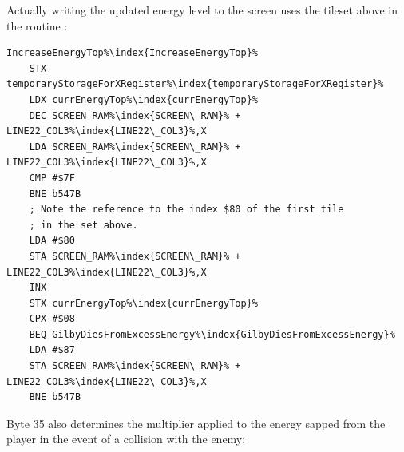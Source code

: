 Actually writing the updated energy level to the screen uses the tileset above in the routine
:
\begin{lstlisting}[escapechar=\%]
IncreaseEnergyTop%\index{IncreaseEnergyTop}%
    STX temporaryStorageForXRegister%\index{temporaryStorageForXRegister}%
    LDX currEnergyTop%\index{currEnergyTop}%
    DEC SCREEN_RAM%\index{SCREEN\_RAM}% + LINE22_COL3%\index{LINE22\_COL3}%,X
    LDA SCREEN_RAM%\index{SCREEN\_RAM}% + LINE22_COL3%\index{LINE22\_COL3}%,X
    CMP #$7F
    BNE b547B
    ; Note the reference to the index $80 of the first tile
    ; in the set above.
    LDA #$80 
    STA SCREEN_RAM%\index{SCREEN\_RAM}% + LINE22_COL3%\index{LINE22\_COL3}%,X
    INX
    STX currEnergyTop%\index{currEnergyTop}%
    CPX #$08
    BEQ GilbyDiesFromExcessEnergy%\index{GilbyDiesFromExcessEnergy}%
    LDA #$87
    STA SCREEN_RAM%\index{SCREEN\_RAM}% + LINE22_COL3%\index{LINE22\_COL3}%,X
    BNE b547B
\end{lstlisting}

Byte 35 also determines the multiplier applied to the energy sapped from the player in the 
event of a collision with the enemy:

